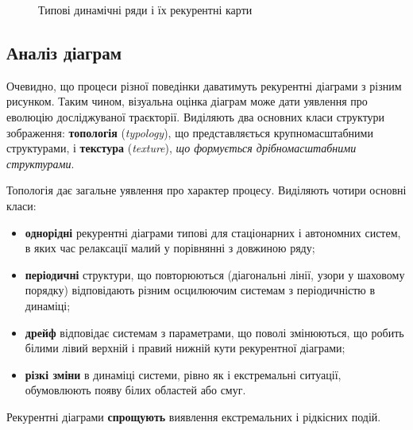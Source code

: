 \documentclass[
  letterpaper,
]{report}
\providecommand{\tightlist}{%
  \setlength{\itemsep}{0pt}\setlength{\parskip}{0pt}}\usepackage{longtable,booktabs,array}
\begin{document}
\begin{figure}
{}

\caption{\label{fig-recurrence-types}Типові динамічні ряди і їх
рекурентні карти}

\end{figure}

\hypertarget{ux430ux43dux430ux43bux456ux437-ux434ux456ux430ux433ux440ux430ux43c}{%
\subsection{Аналіз
діаграм}\label{ux430ux43dux430ux43bux456ux437-ux434ux456ux430ux433ux440ux430ux43c}}

Очевидно, що процеси різної поведінки даватимуть рекурентні діаграми з
різним рисунком. Таким чином, візуальна оцінка діаграм може дати
уявлення про еволюцію досліджуваної траєкторії. Виділяють два основних
класи структури зображення: \textbf{топологія} (\emph{typology}), що
представляється крупномасштабними структурами, і \textbf{текстура}
(\emph{texture}), \emph{що формується дрібномасштабними структурами}.

Топологія дає загальне уявлення про характер процесу. Виділяють чотири
основні класи:

\begin{itemize}
\tightlist
\item
  \textbf{однорідні} рекурентні діаграми типові для стаціонарних і
  автономних систем, в яких час релаксації малий у порівнянні з довжиною
  ряду;
\item
  \textbf{періодичні} структури, що повторюються (діагональні лінії,
  узори у шаховому порядку) відповідають різним осцилюючим системам з
  періодичністю в динаміці;
\item
  \textbf{дрейф} відповідає системам з параметрами, що поволі
  змінюються, що робить білими лівий верхній і правий нижній кути
  рекурентної діаграми;
\item
  \textbf{різкі зміни} в динаміці системи, рівно як і екстремальні
  ситуації, обумовлюють появу білих областей або смуг.
\end{itemize}

Рекурентні діаграми \textbf{спрощують} виявлення екстремальних і
рідкісних подій.
\end{document}
